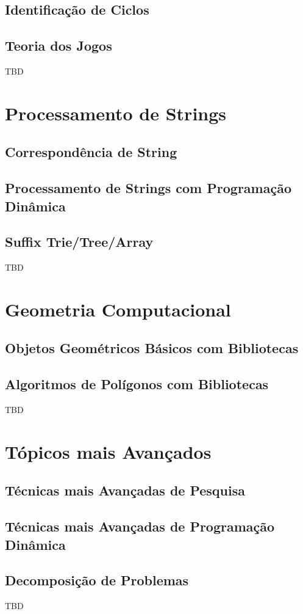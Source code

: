 \documentclass[11pt]{scrartcl}
\begin{document}
\subsection{Identificação de Ciclos}

\subsection{Teoria dos Jogos}

TBD


\section{Processamento de Strings}

\subsection{Correspondência de String}

\subsection{Processamento de Strings com Programação Dinâmica}

\subsection{Suffix Trie/Tree/Array}

TBD


\section{Geometria Computacional}

\subsection{Objetos Geométricos Básicos com Bibliotecas}

\subsection{Algoritmos de Polígonos com Bibliotecas}

TBD


\section{Tópicos mais Avançados}

\subsection{Técnicas mais Avançadas de Pesquisa}

\subsection{Técnicas mais Avançadas de Programação Dinâmica}

\subsection{Decomposição de Problemas}

TBD
\end{document}
